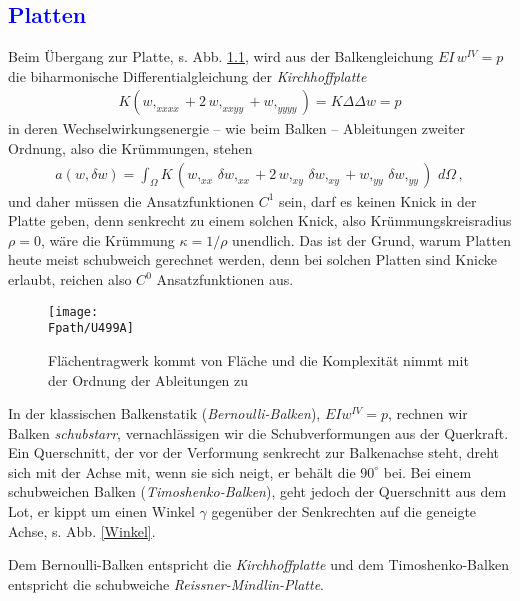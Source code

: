 \setcounter{chapter}{4}
{\textcolor{blue}{\chapter{Platten}}}

Beim \"{U}bergang zur Platte, s. Abb. \ref{U499}, wird aus der Balkengleichung $EI\,w^{IV} = p$ die biharmonische Differentialgleichung der {\em Kirchhoffplatte\/}
\begin{align} \label{Eq13}
 K(w,_{xxxx} + 2\, w,_{xxyy} + w,_{yyyy}) = K \Delta\Delta w = p
\end{align}
in deren Wechselwirkungsenergie -- wie beim Balken -- Ableitungen zweiter Ordnung, also die Kr\"{u}mmungen, stehen
\begin{align}\label{Eq17}%
a(w,\delta w) = \int_{\Omega} K\,(w,_{xx}\, \delta w,_{xx} + 2\,w,_{xy}\,\delta w,_{xy} + w,_{yy}\,\delta w,_{yy})\,\,d\Omega\,,
\end{align}
und daher m\"{u}ssen die Ansatzfunktionen $C^1$ sein, darf es keinen Knick in der Platte geben, denn senkrecht zu einem solchen Knick, also Kr\"{u}mmungskreisradius $\rho = 0$, w\"{a}re die Kr\"{u}mmung $\kappa = 1/\rho$ unendlich. Das ist der Grund, warum Platten heute meist schubweich gerechnet werden, denn bei solchen Platten sind Knicke erlaubt, reichen also $C^0 $ Ansatzfunktionen aus.
\begin{figure}[tbp]
\centering
\if {} \sidecaption \fi
\texttt{[image: \\Fpath/U499A]}  %
\caption{Fl\"{a}chentragwerk kommt von Fl\"{a}che und die Komplexit\"{a}t nimmt mit der Ordnung der Ableitungen zu} \label{U499}
\end{figure}%

In der klassischen Balkenstatik ({\em Bernoulli-Balken\/}), $EI w^{IV} = p$, rechnen wir Balken {\em schubstarr\/},
vernachl\"{a}ssigen wir die Schubverformungen aus der Querkraft. Ein Querschnitt, der vor der Verformung senkrecht zur Balkenachse steht, dreht sich mit der Achse mit, wenn sie sich neigt, er beh\"{a}lt die $90^\circ$ bei. Bei einem schubweichen Balken ({\em Timoshenko-Balken\/}), geht jedoch der Querschnitt aus dem Lot, er kippt um einen Winkel $\gamma$ gegen\"{u}ber der Senkrechten auf die geneigte Achse, s. Abb. \ref{Winkel}.

Dem Bernoulli-Balken entspricht die {\em Kirchhoffplatte\/} und dem Timo\-shenko-Balken entspricht
die schubweiche {\em Reissner-Mindlin-Platte\/}.\\

